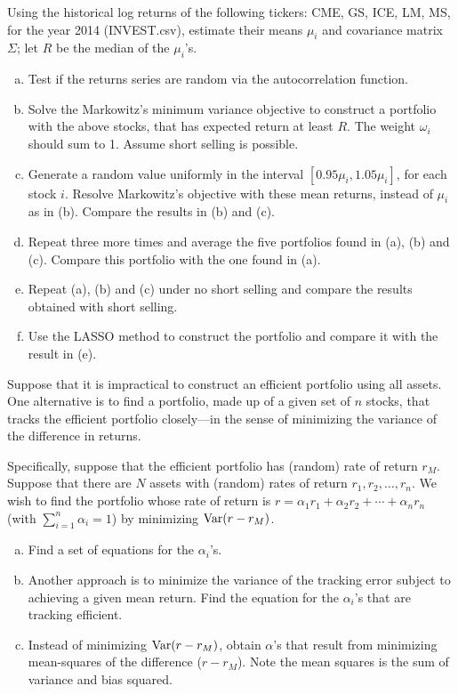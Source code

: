 \prob Using the historical log returns of the following tickers: CME, GS, ICE, LM, MS, for the year 2014 (INVEST.csv), estimate their means $\mu_i$ and covariance matrix $\Sigma$; let $R$ be the median of the $\mu_i$'s. 
	\begin{enumerate}[(a)]
	\item Test if the returns series are random via the autocorrelation function.
	\item Solve the Markowitz's minimum variance objective to construct a portfolio with the above stocks, that has expected return at least $R$. The weight $\omega_i$ should sum to 1. Assume short selling is possible.
	\item Generate a random value uniformly in the interval $[0.95\mu_i,1.05\mu_i]$, for each stock $i$. Resolve Markowitz's objective with these mean returns, instead of $\mu_i$ as in (b). Compare the results in (b) and (c).
	\item Repeat three more times and average the five portfolios found in (a), (b) and (c). Compare this portfolio with the one found in (a).
	\item Repeat (a), (b) and (c) under no short selling and compare the results obtained with short selling.
	\item Use the LASSO method to construct the portfolio and compare it with the result in (e). \twomedskip
	\end{enumerate}
	

\prob Suppose that it is impractical to construct an efficient portfolio using all assets. One alternative is to find a portfolio, made up of a given set of $n$ stocks, that tracks the efficient portfolio closely---in the sense of minimizing the variance of the difference in returns.


Specifically, suppose that the efficient portfolio has (random) rate of return $r_M$. Suppose that there are $N$ assets with (random) rates of return $r_1,r_2,\ldots,r_n$. We wish to find the portfolio whose rate of return is $r=\alpha_1 r_1+ \alpha_2 r_2+ \cdots+ \alpha_n r_n$ (with $\sum_{i=1}^n \alpha_i=1$) by minimizing $\operatorname{Var}(r - r_M)$.
	\begin{enumerate}[(a)]
	\item Find a set of equations for the $\alpha_i$'s.
	\item Another approach is to minimize the variance of the tracking error subject to achieving a given mean return. Find the equation for the $\alpha_i$'s that are tracking efficient.
	\item Instead of minimizing $\operatorname{Var}(r-r_M)$, obtain $\alpha$'s that result from minimizing mean-squares of the difference ($r - r_M$). Note the mean squares is the sum of variance and bias squared. \twomedskip
	\end{enumerate}


